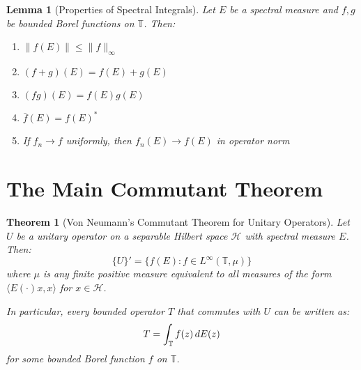 \documentclass{article}
\newtheorem{lemma}{Lemma}
\newtheorem{theorem}{Theorem}
\begin{document}
\begin{lemma}
  [Properties of Spectral Integrals] Let $E$ be a spectral measure and $f, g$
  be bounded Borel functions on $\mathbb{T}$. Then:
  \begin{enumerate}
    \item $\|f (E)\| \leq \|f\|_{\infty}$
    
    \item $(f + g) (E) = f (E) + g (E)$
    
    \item $(fg) (E) = f (E) g (E)$
    
    \item $\bar{f} (E) = f (E)^{\ast}$
    
    \item If $f_n \to f$ uniformly, then $f_n (E) \to f (E)$ in operator norm
  \end{enumerate}
\end{lemma}

\section{The Main Commutant Theorem}

\begin{theorem}
  [Von Neumann's Commutant Theorem for Unitary Operators] Let $U$ be a unitary
  operator on a separable Hilbert space $\mathcal{H}$ with spectral measure
  $E$. Then:
  \begin{equation}
    \{U\}' = \{f (E) : f \in L^{\infty} (\mathbb{T}, \mu)\}
  \end{equation}
  where $\mu$ is any finite positive measure equivalent to all measures of the
  form $\langle E (\cdot) x, x \rangle$ for $x \in \mathcal{H}$.
  
  In particular, every bounded operator $T$ that commutes with $U$ can be
  written as:
  \begin{equation}
    T = \int_{\mathbb{T}} f (z)  \hspace{0.17em} dE (z)
  \end{equation}
  for some bounded Borel function $f$ on $\mathbb{T}$.
\end{theorem}
\end{document}
